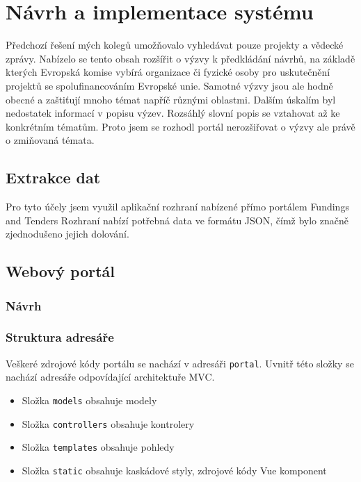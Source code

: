 \chapter{Návrh a implementace systému}
Předchozí řešení mých kolegů umožňovalo vyhledávat pouze projekty a vědecké zprávy. Nabízelo se tento obsah rozšířit o výzvy k předkládání návrhů, na základě kterých Evropská komise vybírá organizace či fyzické osoby pro uskutečnění projektů se spolufinancováním Evropské unie.
Samotné výzvy jsou ale hodně obecné a zaštiťují mnoho témat napříč různými oblastmi. Dalším úskalím byl nedostatek informací v popisu výzev. Rozsáhlý slovní popis se vztahovat až ke konkrétním tématům. Proto jsem se rozhodl portál nerozšiřovat o výzvy ale právě o zmiňovaná témata.

\section{Extrakce dat}
\blindtext

Pro tyto účely jsem využil aplikační rozhraní nabízené přímo portálem Fundings and Tenders %
Rozhraní nabízí potřebná data ve formátu JSON, čímž bylo značně zjednodušeno jejich dolování.

\section{Webový portál}
\blindtext

\subsection{Návrh}
\blindtext

\subsection{Struktura adresáře}
Veškeré zdrojové kódy portálu se nachází v adresáři \texttt{portal}. Uvnitř této složky se nachází adresáře odpovídající architektuře MVC.
\begin{itemize}
  \item Složka \texttt{models} obsahuje modely
  \item Složka \texttt{controllers} obsahuje kontrolery
  \item Složka \texttt{templates} obsahuje pohledy
  \item Složka \texttt{static} obsahuje kaskádové styly, zdrojové kódy Vue komponent
\end{itemize}

